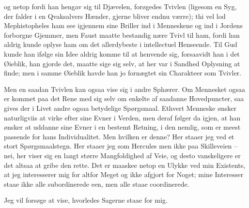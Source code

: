 \documentclass[12pt,a4paper]{article}
\begin{document}
og netop fordi han hengav sig til Djævelen, forøgedes Tvivlen (ligesom en Syg, der falder i en Qvaksalvers Hænder, gjerne bliver endnu værre); thi vel lod Mephistopheles ham see igjennem sine Briller ind i Menneskene og ind i Jordens forborgne Gjemmer, men Faust maatte bestandig nære Tvivl til ham, fordi han aldrig kunde oplyse ham om det allerdybeste i intellectuel Henseende. Til Gud kunde han ifølge sin Idee aldrig komme til at henvende sig, forsaavidt han i det Øieblik, han gjorde det, maatte sige sig selv, at her var i Sandhed Oplysning at finde; men i samme Øieblik havde han jo fornægtet sin Charakteer som Tvivler.

Men en saadan Tvivlen kan ogsaa vise sig i andre Sphærer. Om Mennesket ogsaa er kommet paa det Rene med sig selv om enkelte af saadanne Hovedpuncter, saa gives der i Livet andre ogsaa betydelige Spørgsmaal. Ethvert Menneske ønsker naturligviis at virke efter sine Evner i Verden, men deraf følger da igjen, at han ønsker at uddanne sine Evner i en bestemt Retning, i den nemlig, som er meest passende for hans Individualitet. Men hvilken er denne? Her staaer jeg ved et stort Spørgsmaalstegn. Her staaer jeg som Hercules men ikke paa Skilleveien – nei, her viser sig en langt større Mangfoldighed af Veie, og desto vanskeligere er det altsaa at gribe den rette. Det er maaskee netop en Ulykke ved min Existents, at jeg interesserer mig for altfor Meget og ikke afgjort for Noget; mine Interesser staae ikke alle subordinerede een, men alle staae coordinerede.

Jeg vil forsøge at vise, hvorledes Sagerne staae for mig.
\end{document}
